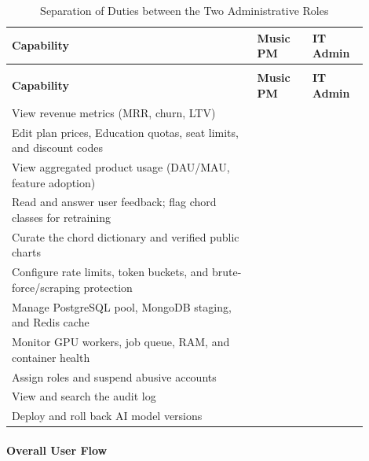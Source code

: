 \documentclass[a4paper]{article}
\newcommand{\cmark}{\ding{51}}
\newcommand{\xmark}{\ding{55}}
\begin{document}
\begin{longtable}{@{}
    >{\raggedright\arraybackslash}p{0.62\linewidth}
    >{\centering\arraybackslash}p{0.14\linewidth}
    >{\centering\arraybackslash}p{0.14\linewidth}@{}}

    \caption{Separation of Duties between the Two Administrative Roles}\label{tab:duties} \\
    \toprule
    \textbf{Capability} & \textbf{Music PM} & \textbf{IT Admin} \\
    \midrule
    \endfirsthead
    \multicolumn{3}{l}{\footnotesize\itshape (Table~\ref{tab:duties} continued)}\\
    \toprule
    \textbf{Capability} & \textbf{Music PM} & \textbf{IT Admin} \\
    \midrule
    \endhead
    \bottomrule
    \endlastfoot

    View revenue metrics (MRR, churn, LTV) & \cmark & \xmark \\
    \addlinespace
    Edit plan prices, Education quotas, seat limits, and discount codes & \cmark & \xmark \\
    \addlinespace
    View aggregated product usage (DAU/MAU, feature adoption) & \cmark & \xmark \\
    \addlinespace
    Read and answer user feedback; flag chord classes for retraining & \cmark & \xmark \\
    \addlinespace
    Curate the chord dictionary and verified public charts & \cmark & \xmark \\
    \addlinespace
    Configure rate limits, token buckets, and brute-force/scraping protection & \xmark & \cmark \\
    \addlinespace
    Manage PostgreSQL pool, MongoDB staging, and Redis cache & \xmark & \cmark \\
    \addlinespace
    Monitor GPU workers, job queue, RAM, and container health & \xmark & \cmark \\
    \addlinespace
    Assign roles and suspend abusive accounts & \xmark & \cmark \\
    \addlinespace
    View and search the audit log & \xmark & \cmark \\
    \addlinespace
    Deploy and roll back AI model versions & \xmark & \cmark \\
\end{longtable}

\paragraph{Overall User Flow}
\end{document}
